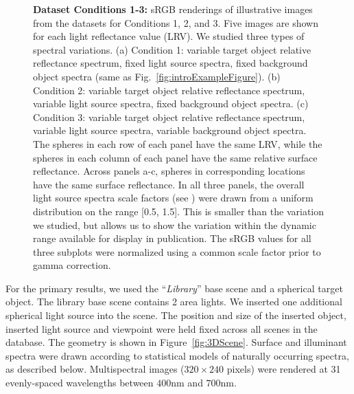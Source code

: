 \documentclass{jov}
\begin{document}
\begin{figure}
\begin{subfigure}[b]{0.33 \textwidth}
        \label{fig:allSpectraVarying}
    \end{subfigure}    
    \caption{{\bf Dataset Conditions 1-3:} sRGB renderings of illustrative images from the datasets for Conditions 1, 2, and 3. Five images are shown for each light reflectance value (LRV). We studied three types of spectral variations. (a) Condition 1: variable target object relative reflectance spectrum, fixed light source spectra, fixed background object spectra (same as Fig.~\ref{fig:introExampleFigure}). 
(b) Condition 2: variable target object relative reflectance spectrum, variable light source spectra, fixed background object spectra. (c) Condition 3: variable target object relative reflectance spectrum, variable light source spectra, variable background object spectra. The spheres in each row of each panel have the same LRV, while the spheres in each column of each panel have the same relative surface reflectance.  Across panels a-c, spheres in corresponding locations have the same surface reflectance. In all three panels, the overall light source spectra scale factors (see ) were drawn from a uniform distribution on the range [0.5, 1.5]. This is smaller than the variation we studied, but allows us to show the variation within the dynamic range available for display in publication. The sRGB values for all three subplots were normalized using a common scale factor prior to gamma correction.} 
\label{fig:studiedCases}
\end{figure}

For the primary results, we used the ``{\it Library}'' base scene and a spherical target object.
The library base scene contains 2 area lights. 
We inserted one additional spherical light source into the scene.
The position and size of the inserted object, inserted light source and viewpoint were held fixed across all 
scenes in the database. The geometry is shown in Figure~\ref{fig:3DScene}.
Surface and illuminant spectra were drawn according to statistical models of naturally occurring spectra, as described below.
Multispectral images ($320 \times 240$ pixels) were rendered at 31 evenly-spaced wavelengths between $400$nm and $700$nm.
\end{document}
